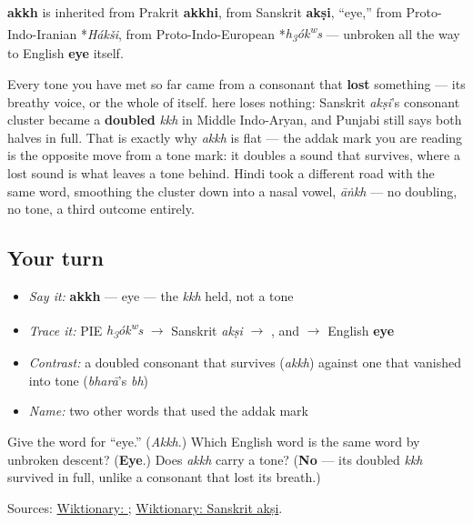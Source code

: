 \begin{cousinweb}
\textbf{akkh} is inherited from Prakrit \textbf{akkhi}, from Sanskrit \textbf{akṣi}, \textquotedblleft{}eye,\textquotedblright{} from Proto-Indo-Iranian *\emph{Hákši}, from Proto-Indo-European *\emph{h\textsubscript{3}ók\textsuperscript{w}s} — unbroken all the way to English \textbf{eye} itself.

Every tone you have met so far came from a consonant that \textbf{lost} something — its breathy voice, or the whole of itself. \textbf{} here loses nothing: Sanskrit \emph{akṣi}'s consonant cluster became a \textbf{doubled} \emph{kkh} in Middle Indo-Aryan, and Punjabi still says both halves in full. That is exactly why \emph{akkh} is flat — the addak mark you are reading is the opposite move from a tone mark: it doubles a sound that survives, where a lost sound is what leaves a tone behind. Hindi took a different road with the same word, smoothing the cluster down into a nasal vowel, \emph{āṅkh} — no doubling, no tone, a third outcome entirely.
\end{cousinweb}

\subsection*{Your turn}
\begin{itemize}
\raggedright
  \item \emph{Say it:} \textbf{akkh} — eye — the \emph{kkh} held, not a tone
  \item \emph{Trace it:} PIE \emph{h\textsubscript{3}ók\textsuperscript{w}s} $\to$ Sanskrit \emph{akṣi} $\to$ \textbf{}, and $\to$ English \textbf{eye}
  \item \emph{Contrast:} a doubled consonant that survives (\emph{akkh}) against one that vanished into tone (\emph{bharā}'s \emph{bh})
  \item \emph{Name:} two other words that used the addak mark
\end{itemize}

\begin{tcolorbox}[breakable,colback=teal!4,colframe=teal!35!black,title={Before you move on}]
Give the word for \textquotedblleft{}eye.\textquotedblright{} (\emph{Akkh}.) Which English word is the same word by unbroken descent? (\textbf{Eye}.) Does \emph{akkh} carry a tone? (\textbf{No} — its doubled \emph{kkh} survived in full, unlike a consonant that lost its breath.)

Sources: \href{https://en.wiktionary.org/wiki/\%E0\%A8\%85\%E0\%A9\%B1\%E0\%A8\%96}{Wiktionary: }; \href{https://en.wiktionary.org/wiki/\%E0\%A4\%85\%E0\%A4\%95\%E0\%A5\%8D\%E0\%A4\%B7\%E0\%A4\%BF}{Wiktionary: Sanskrit akṣi}.
\end{tcolorbox}
